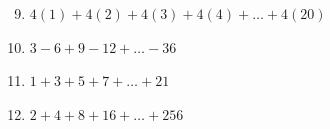 \documentclass[12pt]{article}
\newif\ifans
\begin{document}
\begin{enumerate}
\setcounter{enumi}{8}

\item $4(1)+4(2)+4(3)+4(4)+\dots +4(20)$ 

\ifans{\fbox{$\sum_{k=1}^{20}4k$}} \fi

\item $3-6+9-12+ \dots -36$ 

\ifans{\fbox{$\sum_{k=1}^{12}3(-1)^{k+1}k$}} \fi

\item $1+3+5+7+ \dots + 21$

\ifans{\fbox{$\sum_{k=0}^{10}(2k+1)$}} \fi

\item $2+4+8+16+ \dots + 256$

\ifans{\fbox{$\sum_{k=1}^{8}2^k$}} \fi

\end{enumerate}

\end{document}
